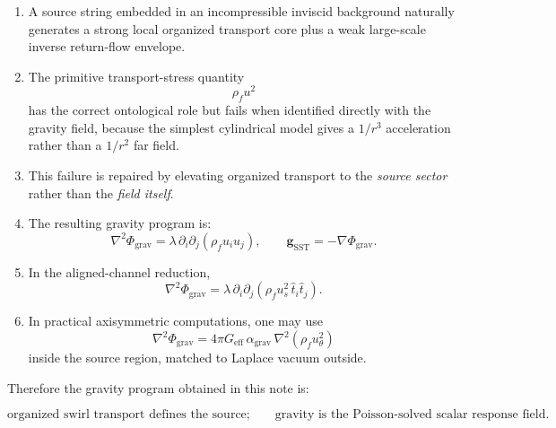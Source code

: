 \documentclass[11pt]{article}
\newcommand{\rhoF}{\rho_{\!f}}
\newcommand{\eff}{\mathrm{eff}}
\newcommand{\SST}{\mathrm{SST}}
\newcommand{\grav}{\mathrm{grav}}
\begin{document}
        \begin{enumerate}[leftmargin=1.5cm]
\item A source string embedded in an incompressible inviscid background naturally generates a strong local organized transport core plus a weak large-scale inverse return-flow envelope.

\item The primitive transport-stress quantity
\[
    \rhoF u^2
\]
has the correct ontological role but fails when identified directly with the gravity field, because the simplest cylindrical model gives a \(1/r^3\) acceleration rather than a \(1/r^2\) far field.

\item This failure is repaired by elevating organized transport to the \emph{source sector} rather than the \emph{field itself}.

\item The resulting gravity program is:
\begin{equation}
    \boxed{
        \nabla^2 \Phi_{\grav}
        =
        \lambda\,\partial_i\partial_j(\rhoF u_i u_j),
        \qquad
        \mathbf{g}_{\SST}=-\nabla\Phi_{\grav}.
    }
\end{equation}

\item In the aligned-channel reduction,
\begin{equation}
    \boxed{
        \nabla^2 \Phi_{\grav}
        =
        \lambda\,\partial_i\partial_j
        \left(
            \rhoF u_s^2\,\hat t_i \hat t_j
        \right).
    }
\end{equation}

\item In practical axisymmetric computations, one may use
\begin{equation}
    \boxed{
        \nabla^2 \Phi_{\grav}
        =
        4\pi G_{\eff}\,\alpha_{\grav}\,\nabla^2(\rhoF u_\theta^2)
    }
\end{equation}
inside the source region, matched to Laplace vacuum outside.
        \end{enumerate}
        
        Therefore the gravity program obtained in this note is:
        
        \begin{equation}
            \boxed{
                \text{organized swirl transport defines the source;}
                \qquad
                \text{gravity is the Poisson-solved scalar response field.}
            }
        \end{equation}
        
\end{document}
